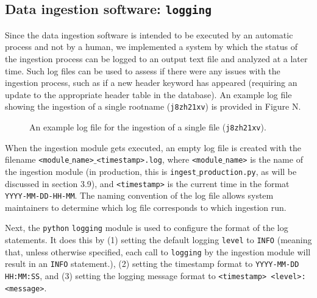 \documentclass[10pt,journal,compsoc]{IEEEtran}
\begin{document}
\subsection{Data ingestion software: \texttt{logging}}

Since the data ingestion software is intended to be executed by an automatic process and not
by a human, we implemented a system by which the status of the ingestion process can be logged
to an output text file and analyzed at a later time.  Such log files can be used to assess if
there were any issues with the ingestion process, such as if a new header keyword has
appeared (requiring an update to the appropriate header table in the database).  An example log
file showing the ingestion of a single rootname (\texttt{j8zh21xv}) is provided in Figure N.

\begin{figure}[!t]
\centering
{}
\caption{An example log file for the ingestion of a single file (\texttt{j8zh21xv}).}
\label{fig1}
\end{figure}

When the ingestion module gets executed, an empty log file is created with the filename
\texttt{<module$\_$name>$\_$<timestamp>.log}, where \texttt{<module$\_$name>} is the name of the
ingestion module (in production, this is \texttt{ingest$\_$production.py}, as will be discussed
in section 3.9), and \texttt{<timestamp>} is the current time in the format \texttt{YYYY-MM-DD-HH-MM}.
The naming convention of the log file allows system maintainers to determine which log file corresponds
to which ingestion run.

Next, the \texttt{python} \texttt{logging} module is used to configure the format of the
log statements.  It does this by (1) setting the default logging \texttt{level} to \texttt{INFO} (meaning
that, unless otherwise specified, each call to \texttt{logging} by the ingestion module will
result in an \texttt{INFO} statement.), (2) setting the timestamp format to \texttt{YYYY-MM-DD HH:MM:SS},
and (3) setting the logging message format to \texttt{<timestamp> <level>: <message>}.
\end{document}
